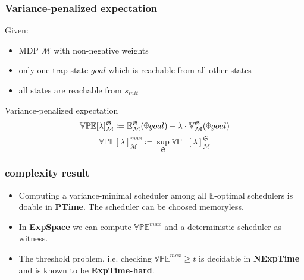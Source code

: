 \documentclass[onlymath]{beamer}
\begin{document}
\begin{frame}
	\frametitle{Variance-penalized expectation}
	Given:
	\begin{itemize}
		\item MDP $\mathcal{M}$ with non-negative weights \pause
		\item only one trap state $goal$ which is reachable from all other states \pause
		\item all states are reachable from $s_{init}$
	\end{itemize} \pause
	\begin{block}{Variance-penalized expectation}
		\[
		\mathbb{VPE}[\lambda]_{\mathcal{M}}^{\mathfrak{S}} \coloneqq \mathbb{E}_{\mathcal{M}}^{\mathfrak{S}}(\rawdiaplus goal) - \lambda \cdot \mathbb{V}_{\mathcal{M}}^{\mathfrak{S}}(\rawdiaplus goal)
		\] \pause
		\[
		\mathbb{VPE}[\lambda]_{\mathcal{M}}^{max} \coloneqq \sup_{\mathfrak{S}} \mathbb{VPE}[\lambda]_{\mathcal{M}}^{\mathfrak{S}}
		\]
	\end{block}
\end{frame}

\begin{frame}
	\frametitle{complexity result}
	\begin{itemize}
		\item Computing a variance-minimal scheduler among all $\mathbb{E}$-optimal schedulers is doable in \textbf{PTime}. The scheduler can be choosed memoryless. \pause
		\item In \textbf{ExpSpace} we can compute $\mathbb{VPE}^{max}$ and a deterministic scheduler as witness. \pause
		\item The threshold problem, i.e. checking $\mathbb{VPE}^{max} \geq t$ is decidable in \textbf{NExpTime} and is known to be \textbf{ExpTime-hard}.
	\end{itemize}
\end{frame}

\end{document}
